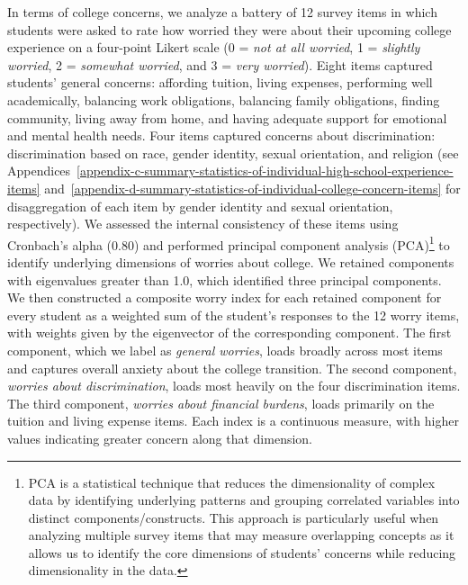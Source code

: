 In terms of college concerns, we analyze a battery of 12 survey items in
which students were asked to rate how worried they were about their
upcoming college experience on a four-point Likert scale (0 = \emph{not at
all worried}, 1 = \emph{slightly worried}, 2 = \emph{somewhat worried}, and 3 =
\emph{very worried}). Eight items captured students' general concerns:
affording tuition, living expenses, performing well academically,
balancing work obligations, balancing family obligations, finding
community, living away from home, and having adequate support for
emotional and mental health needs. Four items captured concerns about
discrimination: discrimination based on race, gender identity, sexual
orientation, and religion (see Appendices~\ref{appendix-c-summary-statistics-of-individual-high-school-experience-items} and~\ref{appendix-d-summary-statistics-of-individual-college-concern-items} for disaggregation of
each item by gender identity and sexual orientation, respectively). We
assessed the internal consistency of these items using Cronbach's alpha
(0.80) and performed principal component analysis (PCA)\footnote{PCA is a statistical technique that reduces the dimensionality of complex data by identifying underlying patterns and grouping correlated variables into distinct components/constructs. This approach is particularly useful when analyzing multiple survey items that may measure overlapping concepts as it allows us to identify the core dimensions of students' concerns while reducing dimensionality in the data.} to identify
underlying dimensions of worries about college. We retained components
with eigenvalues greater than 1.0, which identified three principal
components. We then constructed a composite worry index for each
retained component for every student as a weighted sum of the student's
responses to the 12 worry items, with weights given by the eigenvector
of the corresponding component. The first component, which we label as
\emph{general worries}, loads broadly across most items and captures overall
anxiety about the college transition. The second component, \emph{worries
about discrimination}, loads most heavily on the four discrimination
items. The third component, \emph{worries about financial burdens}, loads
primarily on the tuition and living expense items. Each index is a
continuous measure, with higher values indicating greater concern along
that dimension.

